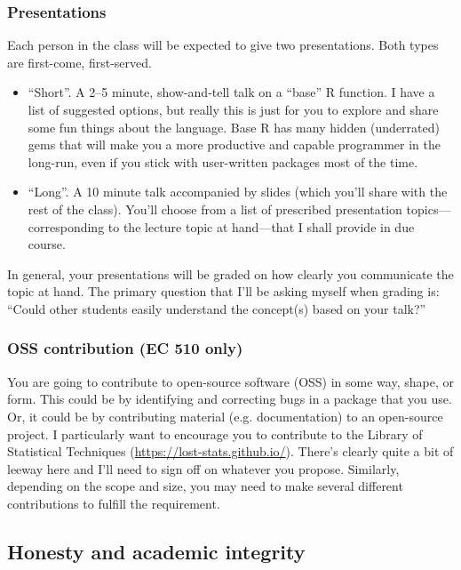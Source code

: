 \documentclass[12]{article}
\begin{document}
\subsubsection*{Presentations}

Each person in the class will be expected to give two presentations.  Both types
are first-come, first-served.
\begin{itemize}
	\item ``Short''. A 2--5 minute, show-and-tell talk on a ``base'' R function.
	I have a list of suggested options, but really this is just for you to
	explore and share some fun things about the language. Base R has many hidden
	(underrated) gems that will make you a more productive and capable
	programmer in the long-run, even if you	stick with user-written packages
	most of the time.  \item ``Long''. A 10 minute talk accompanied by slides
	(which you'll share with the rest of the class). You'll choose from a list
	of prescribed presentation topics---corresponding to the lecture topic at
	hand---that I shall provide in due course.
\end{itemize}
In general, your presentations will be graded on how clearly you communicate 
the topic at hand. The primary question that I'll be asking myself when grading 
is: ``Could other students easily understand the concept(s) based on your
talk?''

\vspace{-0.25cm}
\subsubsection*{OSS contribution (EC 510 only)}

You are going to contribute to open-source software (OSS) in some way, shape, or
form. This could be by identifying and correcting bugs in a package that you
use. Or, it could be by contributing material (e.g. documentation) to an
open-source project. I particularly want to encourage you to contribute to the
Library of Statistical Techniques (\url{https://lost-stats.github.io/}). There's
clearly quite a bit of leeway here and I'll need to sign off on whatever you
propose. Similarly, depending on the scope and size, you may need to make
several different contributions to fulfill the requirement.

\subsection*{Honesty and academic integrity}
\end{document}
